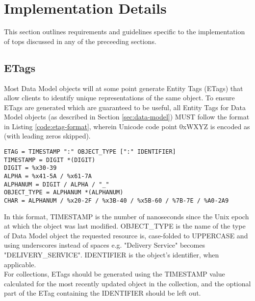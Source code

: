 %
%

\section{Implementation Details}
This section outlines requirements and guidelines specific to the
implementation of tops discussed in any of the preceeding sections.

\subsection{ETags\label{sec:etags}}
Most Data Model objects will at some point generate Entity Tags (ETags) that
allow clients to identify unique representations of the same object. To ensure
ETags are generated which are guaranteed to be useful, all Entity Tags for
Data Model objects (as described in Section \ref{sec:data-model}) MUST follow
the format in Listing \ref{code:etag-format}, wherein Unicode code point 0xWXYZ
is encoded as  (with leading zeros skipped).

\begin{codelisting}
\label{code:etag-format}
\begin{verbatim}
ETAG = TIMESTAMP ":" OBJECT_TYPE [":" IDENTIFIER]
TIMESTAMP = DIGIT *(DIGIT)
DIGIT = %x30-39
ALPHA = %x41-5A / %x61-7A
ALPHANUM = DIGIT / ALPHA / "_"
OBJECT_TYPE = ALPHANUM *(ALPHANUM)
CHAR = ALPHANUM / %x20-2F / %x3B-40 / %x5B-60 / %7B-7E / %A0-2A9
\end{verbatim}
\end{codelisting}

In this format, TIMESTAMP is the number of nanoseconds since the Unix epoch at
which the object was last modified. OBJECT\_TYPE is the name of the type of
Data Model object the requested resource is, case-folded to UPPERCASE and using
underscores instead of spaces e.g. "Delivery Service" becomes
"DELIVERY_SERVICE". IDENTIFIER is the object's identifier, when applicable.\\
For collections, ETags should be generated using the TIMESTAMP value calculated
for the most recently updated object in the collection, and the optional part
of the ETag containing the IDENTIFIER should be left out.
